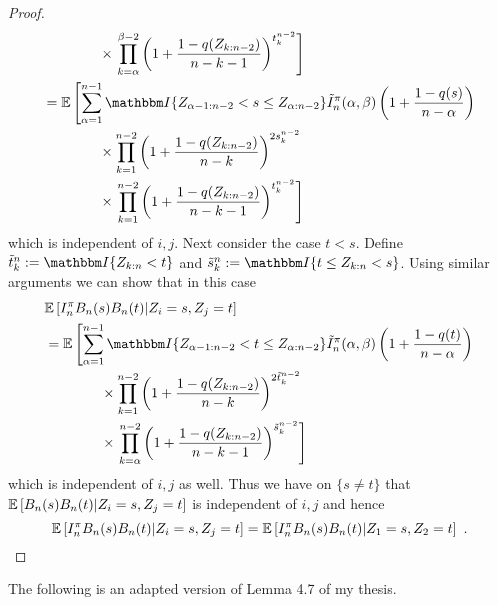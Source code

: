 \begin{lemma}
\begin{proof}
\begin{align*}
			&\qquad\qquad \times \left. \prod_{k=\alpha}^{\beta-2}\left(1+\frac{1-q(Z_{k:n-2})}{n-k-1}\right)^{t_{k}^{n-2}}\right]\\
			&= \E\left[\sum_{\alpha=1}^{n-1} \I{Z_{\alpha-1:n-2} < s \leq Z_{\alpha:n-2}} \tilde{I}_n^\pi(\alpha, \beta) \left(1+\frac{1-q(s)}{n-\alpha}\right) \right.\\ 
			&\qquad\qquad \times \prod_{k=1}^{n-2}\left(1+\frac{1-q(Z_{k:n-2})}{n-k}\right)^{2s_k^{n-2}} \\
			&\qquad\qquad \times \left. \prod_{k=1}^{n-2}\left(1+\frac{1-q(Z_{k:n-2})}{n-k-1}\right)^{t_{k}^{n-2}}\right]
		\end{align*}		
		which is independent of $i,j$. 
		Next consider the case $t<s$. Define $\tilde{t}_k^n := \I{Z_{k:n} < t}$ and $\tilde{s}_k^n := \I{t\leq Z_{k:n} < s}$. Using similar arguments we can show that in this case 
		\begin{align*}
		&\E\left[I_n^\pi B_n(s)B_n(t)|Z_i=s, Z_j=t\right]\\
		&= \E\left[\sum_{\alpha=1}^{n-1} \I{Z_{\alpha-1:n-2} < t \leq Z_{\alpha:n-2}} \tilde{I}_n^\pi(\alpha, \beta) \left(1+\frac{1-q(t)}{n-\alpha}\right) \right.\\ 
		&\qquad\qquad \times \prod_{k=1}^{n-2}\left(1+\frac{1-q(Z_{k:n-2})}{n-k}\right)^{2\tilde{t}_k^{n-2}} \\
		&\qquad\qquad \times \left. \prod_{k=\alpha}^{n-2}\left(1+\frac{1-q(Z_{k:n-2})}{n-k-1}\right)^{\tilde{s}_{k}^{n-2}}\right]
		\end{align*}	
		which is independent of $i,j$ as well. Thus we have on $\{s\neq t\}$ that $\mathbb{E}\left[B_n(s)B_n(t)|Z_i=s, Z_j=t\right]$ is independent of $i,j$ and hence
		$$\mathbb{E}\left[I_n^\pi B_n(s)B_n(t)|Z_i=s, Z_j=t\right] = \mathbb{E}\left[I_n^\pi B_n(s)B_n(t)|Z_1=s, Z_2=t\right]\textrm{ .}$$
	\end{proof}
\end{lemma}
%
The following is an adapted version of Lemma 4.7 of my thesis.
